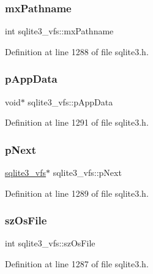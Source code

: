 \subsubsection{\texorpdfstring{mx\+Pathname}{mxPathname}}
{\footnotesize\ttfamily int sqlite3\+\_\+vfs\+::mx\+Pathname}



Definition at line 1288 of file sqlite3.\+h.

\mbox{\label{structsqlite3__vfs_a1ba832cf207fe59c1fc8eb436524bc35}} 
\subsubsection{\texorpdfstring{p\+App\+Data}{pAppData}}
{\footnotesize\ttfamily void$\ast$ sqlite3\+\_\+vfs\+::p\+App\+Data}



Definition at line 1291 of file sqlite3.\+h.

\mbox{\label{structsqlite3__vfs_ae795a4417697ecd35163f6cdf0069073}} 
\subsubsection{\texorpdfstring{p\+Next}{pNext}}
{\footnotesize\ttfamily \mbox{\hyperlink{structsqlite3__vfs}{sqlite3\+\_\+vfs}}$\ast$ sqlite3\+\_\+vfs\+::p\+Next}



Definition at line 1289 of file sqlite3.\+h.

\mbox{\label{structsqlite3__vfs_a549399081342d61134b6398562a0a997}} 
\subsubsection{\texorpdfstring{sz\+Os\+File}{szOsFile}}
{\footnotesize\ttfamily int sqlite3\+\_\+vfs\+::sz\+Os\+File}



Definition at line 1287 of file sqlite3.\+h.

